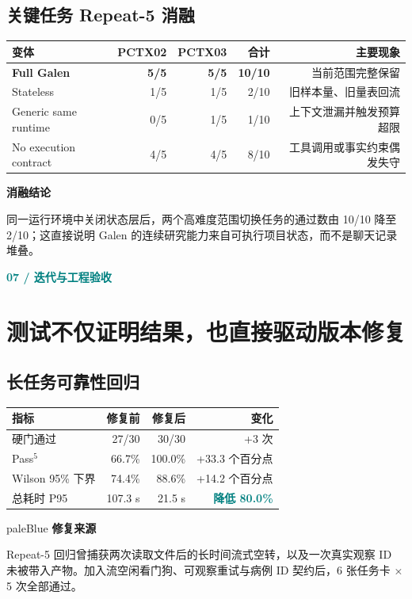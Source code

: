 \documentclass[UTF8,11pt,a4paper]{ctexart}
\newcommand{\kicker}[1]{\textcolor{teal}{\sffamily\bfseries\small #1}\par\vspace{1mm}}
\begin{document}
\subsection*{关键任务 Repeat-5 消融}
\begin{tabularx}{\textwidth}{@{}Y r r r r@{}}
\toprule
\textbf{变体} & \textbf{PCTX02} & \textbf{PCTX03} & \textbf{合计} & \textbf{主要现象}\\
\midrule
\textbf{Full Galen} & \textbf{5/5} & \textbf{5/5} & \textbf{10/10} & 当前范围完整保留\\
Stateless & 1/5 & 1/5 & 2/10 & 旧样本量、旧量表回流\\
Generic same runtime & 0/5 & 1/5 & 1/10 & 上下文泄漏并触发预算超限\\
No execution contract & 4/5 & 4/5 & 8/10 & 工具调用或事实约束偶发失守\\
\bottomrule
\end{tabularx}
\begin{darkbox}
\textbf{消融结论}\par
同一运行环境中关闭状态层后，两个高难度范围切换任务的通过数由 10/10 降至 2/10；这直接说明 Galen 的连续研究能力来自可执行项目状态，而不是聊天记录堆叠。
\end{darkbox}
\clearpage

\kicker{07  /  迭代与工程验收}
\section*{测试不仅证明结果，也直接驱动版本修复}
\subsection*{长任务可靠性回归}
\begin{tabularx}{\textwidth}{@{}Y r r r@{}}
\toprule
\textbf{指标} & \textbf{修复前} & \textbf{修复后} & \textbf{变化}\\
\midrule
硬门通过 & 27/30 & 30/30 & +3 次\\
Pass$^5$ & 66.7\% & 100.0\% & +33.3 个百分点\\
Wilson 95\% 下界 & 74.4\% & 88.6\% & +14.2 个百分点\\
总耗时 P95 & 107.3 s & 21.5 s & \textcolor{teal}{\textbf{降低 80.0\%}}\\
\bottomrule
\end{tabularx}
\begin{card}{paleBlue}
\textbf{修复来源}\par
Repeat-5 回归曾捕获两次读取文件后的长时间流式空转，以及一次真实观察 ID 未被带入产物。加入流空闲看门狗、可观察重试与病例 ID 契约后，6 张任务卡 × 5 次全部通过。
\end{card}
\end{document}
